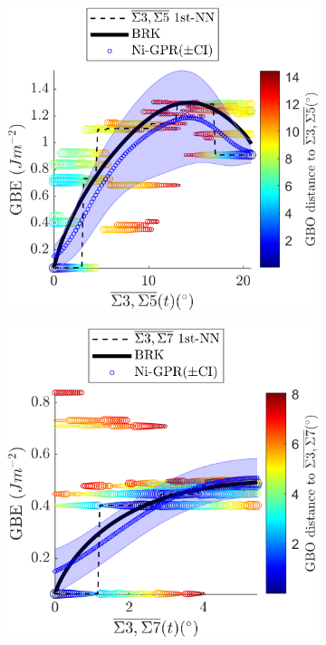 \documentclass[final,twocolumn,12pt]{elsarticle}
\begin{document}
	\begin{figure}[!htb]
		\centering
		\begin{subfigure}[b]{0.48\textwidth}
			\includegraphics[width=\textwidth]{figures/tunnel-3-5-olmsted.png}
			\caption{}
			\label{fig:tunnel-3-5-olmsted}
		\end{subfigure}
		\hfill
		\begin{subfigure}[b]{0.48\textwidth}
			\includegraphics[width=\textwidth]{figures/tunnel-3-7-olmsted.png}
			\caption{}
			\label{fig:tunnel-3-7-olmsted}
		\end{subfigure}
		

\end{figure}
\end{document}

